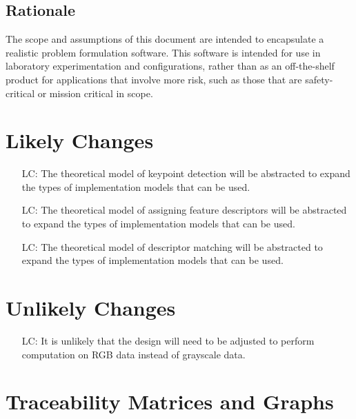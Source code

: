 \documentclass[12pt]{article}
\newcounter{lcnum} %
\begin{document}
\subsection{Rationale}

The scope and assumptions of this document are intended to encapsulate a realistic problem formulation 
software. This software is intended for use in laboratory experimentation and configurations, rather than 
as an off-the-shelf product for applications that involve more risk, such as those that are safety-critical 
or mission critical in scope.

\section{Likely Changes}    

\noindent \begin{itemize}

\item[LC\refstepcounter{lcnum}\thelcnum\label{LC_keypoint_method}:] 
The theoretical model of keypoint detection will be abstracted to expand the types of 
implementation models that can be used.

\item[LC\refstepcounter{lcnum}\thelcnum\label{LC_descriptor_method}:] 
The theoretical model of assigning feature descriptors will be abstracted to expand the types of 
implementation models that can be used.

\item[LC\refstepcounter{lcnum}\thelcnum\label{LC_comparison_method}:] 
The theoretical model of descriptor matching will be abstracted to expand the types of 
implementation models that can be used.

\end{itemize}

\section{Unlikely Changes}    

\noindent \begin{itemize}

\item[LC\refstepcounter{lcnum}\thelcnum\label{RGB_Data}:] It is unlikely that the design 
will need to be adjusted to perform computation on RGB data instead of grayscale data.

\end{itemize}

\section{Traceability Matrices and Graphs}
\end{document}
